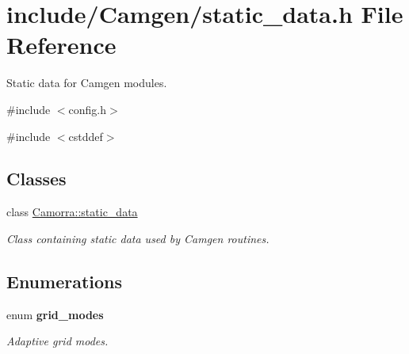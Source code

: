 \hypertarget{a00630}{
\section{include/Camgen/static\_\-data.h File Reference}
\label{a00630}
}


Static data for Camgen modules.  


{\ttfamily \#include $<$config.h$>$}\par
{\ttfamily \#include $<$cstddef$>$}\par
\subsection*{Classes}
\begin{DoxyCompactItemize}
\item 
class \hyperlink{a00497}{Camorra::static\_\-data}
\begin{DoxyCompactList}\small\item\em Class containing static data used by Camgen routines. \end{DoxyCompactList}\end{DoxyCompactItemize}
\subsection*{Enumerations}
\begin{DoxyCompactItemize}
\item 
enum {\bfseries grid\_\-modes} 
\begin{DoxyCompactList}\small\item\em Adaptive grid modes. \end{DoxyCompactList}\end{DoxyCompactItemize}
